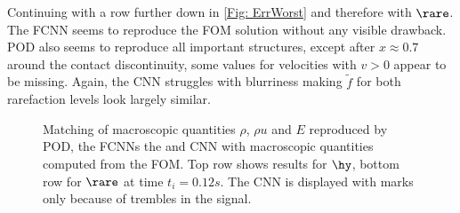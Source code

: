 Continuing with a row further down in \cref{Fig: ErrWorst} and therefore with \(\rare\). The FCNN seems to reproduce the FOM solution without any visible drawback. POD also seems to reproduce all important structures, except after \(x\approx 0.7\) around the contact discontinuity, some values for velocities with \(v>0\) appear to be missing. Again, the CNN struggles with blurriness making \(\tilde{f}\) for both rarefaction levels look largely similar.      
\begin{figure}[H]
	
	\caption{Matching of macroscopic quantities \(\rho\), \(\rho u\) and \(E\) reproduced by POD, the FCNNs the and CNN with macroscopic quantities computed from the FOM. Top row shows results for \(\hy\), bottom row for \(\rare\) at time \(t_i=0.12s\). The CNN is displayed with marks only because of trembles in the signal.}
	\label{Fig:ErrMacro}
\end{figure}
